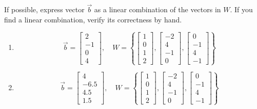 \documentclass{ximera}
\begin{document}
\begin{problem}\label{prob_oct_ideas_1}
    If possible, express vector $\vec{b}$ as a linear combination of the vectors in $W$.  If you find a linear combination, verify its correctness by hand.
    \begin{enumerate}
        \item $$\vec{b}=\begin{bmatrix}2\\-1\\0\\4\end{bmatrix},\quad W=\left\{\begin{bmatrix}1\\0\\1\\2\end{bmatrix}, \begin{bmatrix}-2\\4\\-1\\0\end{bmatrix},\begin{bmatrix}0\\-1\\4\\-1\end{bmatrix}\right\}$$

        \begin{multipleChoice}
        \end{multipleChoice}

        \item 
        $$\vec{b}=\begin{bmatrix}4\\-6.5\\4.5\\1.5\end{bmatrix},\quad W=\left\{\begin{bmatrix}1\\0\\1\\2\end{bmatrix}, \begin{bmatrix}-2\\4\\-1\\0\end{bmatrix},\begin{bmatrix}0\\-1\\4\\-1\end{bmatrix}\right\}$$

         \begin{multipleChoice}
        \end{multipleChoice}
    \end{enumerate}
    
\end{problem}
\end{document}
